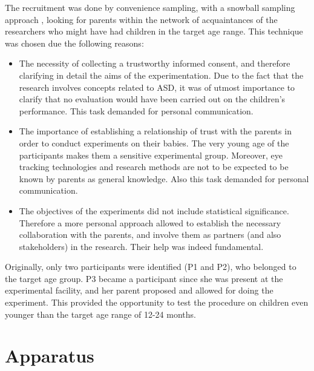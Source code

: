 The recruitment was done by convenience sampling, with a snowball sampling approach \citep[pp. 496, 506]{baxter2015understanding}, looking for parents within the network of acquaintances of the researchers who might have had children in the target age range. This technique was chosen due the following reasons:
\begin{itemize}
    \item The necessity of collecting a trustworthy informed consent, and therefore clarifying in detail the aims of the experimentation. Due to the fact that the research involves concepts related to ASD, it was of utmost importance to clarify that no evaluation would have been carried out on the children’s performance. This task demanded for personal communication.
    \item The importance of establishing a relationship of trust with the parents in order to conduct experiments on their babies. The very young age of the participants makes them a sensitive experimental group. Moreover, eye tracking technologies and research methods are not to be expected to be known by parents as general knowledge. Also this task demanded for personal communication.
    \item The objectives of the experiments did not include statistical significance. Therefore a more personal approach allowed to establish the necessary collaboration with the parents, and involve them as partners (and also stakeholders) in the research. Their help was indeed fundamental.
\end{itemize}

Originally, only two participants were identified (P1 and P2), who belonged to the target age group. P3 became a participant since she was present at the experimental facility, and her parent proposed and allowed for doing the experiment. This provided the opportunity to test the procedure on children even younger than the target age range of 12-24 months.




\section{Apparatus}
\label{sec:expapparatus}

